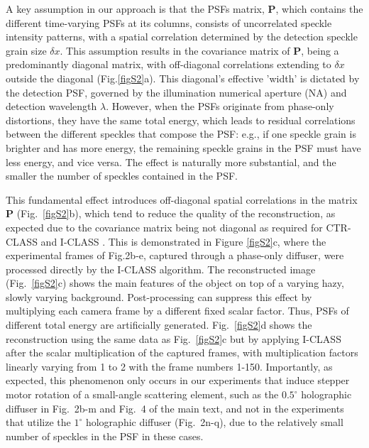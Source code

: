 \documentclass[pdflatex,sn-mathphys-num,Numbered]{sn-jnl}%
\theoremstyle{thmstyleone}%
\theoremstyle{thmstyletwo}%
\theoremstyle{thmstylethree}%
\begin{document}
A key assumption in our approach is that the PSFs matrix, \textbf{P}, which contains the different time-varying PSFs at its columns, consists of uncorrelated speckle intensity patterns, with a spatial correlation determined by the detection speckle grain size $\delta x$. This assumption results in the covariance matrix of \textbf{P}, being a predominantly diagonal matrix, with off-diagonal correlations extending to $\delta x$ outside the diagonal (Fig.\ref{figS2}a). This diagonal's effective 'width' is dictated by the detection PSF, governed by the illumination numerical aperture (NA) and detection wavelength $\lambda$. 
However, when the PSFs originate from phase-only distortions, they have the same total energy, which leads to residual correlations between the different speckles that compose the PSF: e.g., if one speckle grain is brighter and has more energy, the remaining speckle grains in the PSF must have less energy, and vice versa. The effect is naturally more substantial, and the smaller the number of speckles contained in the PSF.

This fundamental effect introduces off-diagonal spatial correlations in the matrix \textbf{P} (Fig.~\ref{figS2}b), which tend to reduce the quality of the reconstruction, as expected due to the covariance matrix being not diagonal as required for CTR-CLASS \cite{lee22} and I-CLASS \cite{weinberg2023noninvasive}. This is demonstrated in Figure \ref{figS2}c, where the experimental frames of Fig.2b-e, captured through a phase-only diffuser, were processed directly by the I-CLASS algorithm. The reconstructed image (Fig.~\ref{figS2}c) shows the main features of the object on top of a varying hazy, slowly varying background. 
Post-processing can suppress this effect by multiplying each camera frame by a different fixed scalar factor. Thus, PSFs of different total energy are artificially generated. Fig.~\ref{figS2}d shows the reconstruction using the same data as Fig.~\ref{figS2}c but by applying I-CLASS after the scalar multiplication of the captured frames, with multiplication factors linearly varying from 1 to 2 with the frame numbers 1-150. 
Importantly, as expected, this phenomenon only occurs in our experiments that induce stepper motor rotation of a small-angle scattering element, such as the $0.5^\circ$ holographic diffuser in Fig.~2b-m and Fig.~4 of the main text, and not in the experiments that utilize the $1^\circ$ holographic diffuser (Fig.~2n-q), due to the relatively small number of speckles in the PSF in these cases.
\end{document}
